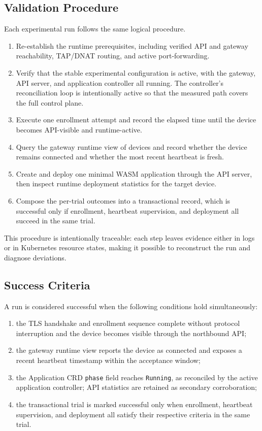 \subsection{Validation Procedure}
Each experimental run follows the same logical procedure.
\begin{enumerate}
    \item Re-establish the runtime prerequisites, including verified API and gateway reachability, TAP/DNAT routing, and active port-forwarding.
    \item Verify that the stable experimental configuration is active, with the gateway, API server, and application controller all running. The controller's reconciliation loop is intentionally active so that the measured path covers the full control plane.
    \item Execute one enrollment attempt and record the elapsed time until the device becomes API-visible and runtime-active.
    \item Query the gateway runtime view of devices and record whether the device remains connected and whether the most recent heartbeat is fresh.
    \item Create and deploy one minimal WASM application through the API server, then inspect runtime deployment statistics for the target device.
    \item Compose the per-trial outcomes into a transactional record, which is successful only if enrollment, heartbeat supervision, and deployment all succeed in the same trial.
\end{enumerate}

This procedure is intentionally traceable: each step leaves evidence either in logs or in Kubernetes resource states, making it possible to reconstruct the run and diagnose deviations.

\subsection{Success Criteria}
A run is considered successful when the following conditions hold simultaneously:
\begin{enumerate}
    \item the TLS handshake and enrollment sequence complete without protocol interruption and the device becomes visible through the northbound API;
    \item the gateway runtime view reports the device as connected and exposes a recent heartbeat timestamp within the acceptance window;
    \item the Application CRD \texttt{phase} field reaches \texttt{Running}, as reconciled by the active application controller; API statistics are retained as secondary corroboration;
    \item the transactional trial is marked successful only when enrollment, heartbeat supervision, and deployment all satisfy their respective criteria in the same trial.
\end{enumerate}

